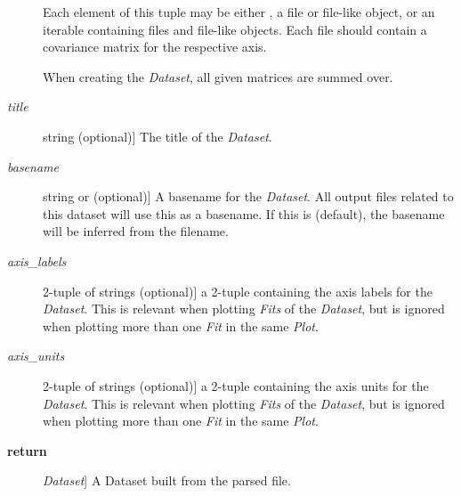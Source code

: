 \documentclass[a4paper,10pt,english]{sphinxmanual}
\begin{document}
\begin{fulllineitems}
\begin{description}
Each element of this tuple may be either , a file or file-like
object, or an iterable containing files and file-like objects. Each
file should contain a covariance matrix for the respective axis.

When creating the \emph{Dataset}, all given matrices are summed over.

\item[{\emph{title}}] \leavevmode{[}string (optional){]}
The title of the \emph{Dataset}.

\item[{\emph{basename}}] \leavevmode{[}string or  (optional){]}
A basename for the \emph{Dataset}. All output files related to this dataset
will use this as a basename. If this is  (default), the
basename will be inferred from the filename.

\item[{\emph{axis\_labels}}] \leavevmode{[}2-tuple of strings (optional){]}
a 2-tuple containing the axis labels for the \emph{Dataset}. This is
relevant when plotting \emph{Fits} of the \emph{Dataset}, but is ignored when
plotting more than one \emph{Fit} in the same \emph{Plot}.

\item[{\emph{axis\_units}}] \leavevmode{[}2-tuple of strings (optional){]}
a 2-tuple containing the axis units for the \emph{Dataset}. This is
relevant when plotting \emph{Fits} of the \emph{Dataset}, but is ignored when
plotting more than one \emph{Fit} in the same \emph{Plot}.

\item[{\textbf{return}}] \leavevmode{[}\emph{Dataset}{]}
A Dataset built from the parsed file.

\end{description}

\end{fulllineitems}

\end{document}
